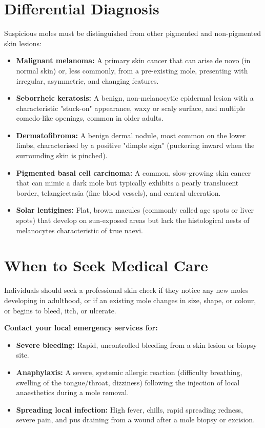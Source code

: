\section*{Differential Diagnosis}
Suspicious moles must be distinguished from other pigmented and non-pigmented skin lesions:
\begin{itemize}
    \item \textbf{Malignant melanoma:} A primary skin cancer that can arise de novo (in normal skin) or, less commonly, from a pre-existing mole, presenting with irregular, asymmetric, and changing features.
    \item \textbf{Seborrheic keratosis:} A benign, non-melanocytic epidermal lesion with a characteristic "stuck-on" appearance, waxy or scaly surface, and multiple comedo-like openings, common in older adults.
    \item \textbf{Dermatofibroma:} A benign dermal nodule, most common on the lower limbs, characterised by a positive "dimple sign" (puckering inward when the surrounding skin is pinched).
    \item \textbf{Pigmented basal cell carcinoma:} A common, slow-growing skin cancer that can mimic a dark mole but typically exhibits a pearly translucent border, telangiectasia (fine blood vessels), and central ulceration.
    \item \textbf{Solar lentigines:} Flat, brown macules (commonly called age spots or liver spots) that develop on sun-exposed areas but lack the histological nests of melanocytes characteristic of true naevi.
\end{itemize}

\section*{When to Seek Medical Care}
Individuals should seek a professional skin check if they notice any new moles developing in adulthood, or if an existing mole changes in size, shape, or colour, or begins to bleed, itch, or ulcerate.

\textbf{Contact your local emergency services for:}
\begin{itemize}
    \item \textbf{Severe bleeding:} Rapid, uncontrolled bleeding from a skin lesion or biopsy site.
    \item \textbf{Anaphylaxis:} A severe, systemic allergic reaction (difficulty breathing, swelling of the tongue/throat, dizziness) following the injection of local anaesthetics during a mole removal.
    \item \textbf{Spreading local infection:} High fever, chills, rapid spreading redness, severe pain, and pus draining from a wound after a mole biopsy or excision.
\end{itemize}

